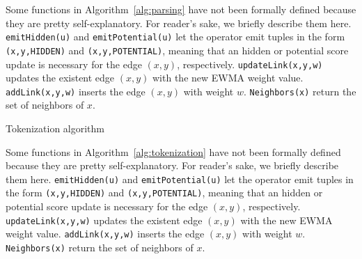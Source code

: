Some functions in Algorithm~\ref{alg:parsing} have not been formally defined because they are pretty self-explanatory. 
For reader's sake, we briefly describe them here. \texttt{emitHidden(u)} and \texttt{emitPotential(u)} let the operator emit tuples in the form \texttt{(x,y,HIDDEN)} and \texttt{(x,y,POTENTIAL)}, meaning that an hidden or potential score update is necessary for the edge $(x,y)$, respectively.
\texttt{updateLink(x,y,w)} updates the existent edge $(x,y)$ with the new EWMA weight value. 
\texttt{addLink(x,y,w)} inserts the edge $(x,y)$ with weight $w$. 
\texttt{Neighbors(x)} return the set of neighbors of $x$.

\begin{algorithm}[t]
	
	 {
		
		
		
		
		
	}
	
	\caption{Tokenization algorithm}
	\label{alg:tokenization}
\end{algorithm}

Some functions in Algorithm~\ref{alg:tokenization} have not been formally defined because they are pretty self-explanatory. 
For reader's sake, we briefly describe them here. \texttt{emitHidden(u)} and \texttt{emitPotential(u)} let the operator emit tuples in the form \texttt{(x,y,HIDDEN)} and \texttt{(x,y,POTENTIAL)}, meaning that an hidden or potential score update is necessary for the edge $(x,y)$, respectively.
\texttt{updateLink(x,y,w)} updates the existent edge $(x,y)$ with the new EWMA weight value. 
\texttt{addLink(x,y,w)} inserts the edge $(x,y)$ with weight $w$. 
\texttt{Neighbors(x)} return the set of neighbors of $x$.